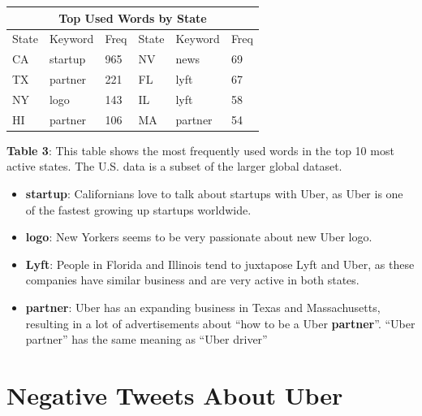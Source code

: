 \documentclass[a222,landscape]{a0poster}
\begin{document}
\begin{multicols}{4}
\begin{center}
\begin{tabular}{|p{2cm}|p{5cm}|p{2cm}||p{2cm}|p{5cm}|p{2cm}|}
    \hline
    \multicolumn{6}{|c|}{\cellcolor{blue!25}Top Used Words by State} \\
    \hline
     State& Keyword&Freq &State& Keyword&Freq\\
     \hline
        CA&startup&965 & NV&news&69\\
	TX&partner&221 & FL&lyft&67\\
	NY&logo&143 & IL&lyft&58\\
	HI&partner&106 &MA&partner&54\\	
	\hline
\end{tabular}
\end{center}
\vspace{0.25 cm} 
\small \textbf{Table 3}: \color{Green} This table shows the most frequently used words in the top 10 most active states. The U.S. data is a subset of the larger global dataset.
\normalsize
\color{DarkSlateGray}

\begin{itemize}
  \item \textbf{startup}: Californians love to talk about startups with Uber, as Uber is one of the fastest growing up startups worldwide.
  \item \textbf{logo}: New Yorkers seems to be very passionate about new Uber logo.
  \item \textbf{Lyft}: People in Florida and Illinois tend to juxtapose Lyft and Uber, as these companies have similar business and  are very active in both states.
  \item \textbf{partner}: Uber has an expanding business in Texas and Massachusetts, resulting in a lot of advertisements about ``how to be a Uber \textbf{partner}''. ``Uber partner'' has the same meaning as ``Uber driver'' 
\end{itemize}

\section*{Negative Tweets About Uber}
\begin{center}\vspace{1cm}


\end{center}
\end{multicols}
\end{document}
